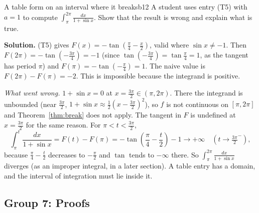 \documentclass[11pt]{article}
\begin{document}
\begin{exmp}{A table form on an interval where it breaks}{b12}
A student uses entry (T5) with $a=1$ to compute $\displaystyle\int_\pi^{2\pi}\frac{dx}{1+\sin x}$. Show that the result is wrong and explain what is true.

\textbf{Solution.} (T5) gives $F(x)=-\tan\left(\frac\pi4-\frac x2\right)$, valid where $\sin x\ne-1$. Then $F(2\pi)=-\tan\left(-\frac{3\pi}4\right)=-1$ (since $\tan\left(-\frac{3\pi}4\right)=\tan\frac\pi4=1$, as the tangent has period $\pi$) and $F(\pi)=-\tan\left(-\frac\pi4\right)=1$. The naive value is $F(2\pi)-F(\pi)=-2$. This is impossible because the integrand is positive.

\emph{What went wrong.} $1+\sin x=0$ at $x=\frac{3\pi}2\in(\pi,2\pi)$. There the integrand is unbounded (near $\frac{3\pi}2$, $1+\sin x\approx\frac12\left(x-\frac{3\pi}2\right)^2$), so $f$ is not continuous on $[\pi,2\pi]$ and Theorem~\ref{thm:break} does not apply. The tangent in $F$ is undefined at $x=\frac{3\pi}2$ for the same reason. For $\pi<t<\frac{3\pi}2$,
\[\int_\pi^t\frac{dx}{1+\sin x}=F(t)-F(\pi)=-\tan\left(\frac\pi4-\frac t2\right)-1\longrightarrow+\infty\quad\left(t\to\tfrac{3\pi}2^-\right),\]
because $\frac\pi4-\frac t2$ decreases to $-\frac\pi2$ and $\tan$ tends to $-\infty$ there. So $\int_\pi^{2\pi}\frac{dx}{1+\sin x}$ diverges (as an improper integral, in a later section). A table entry has a domain, and the interval of integration must lie inside it.
\end{exmp}

\subsection*{Group 7: Proofs}
\end{document}
